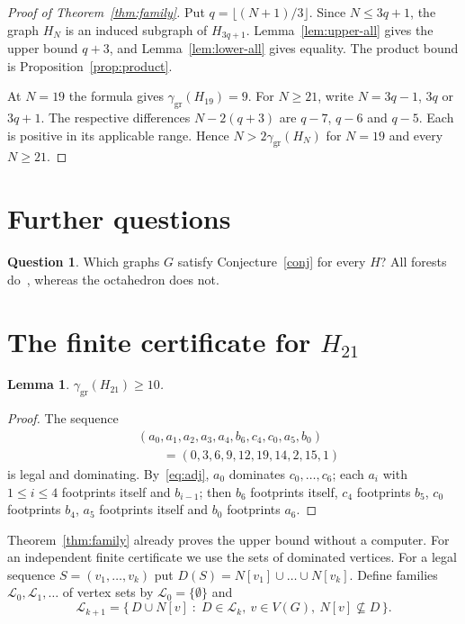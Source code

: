 \documentclass[screen]{aomart}
\newtheorem{lemma}[theorem]{Lemma}
\theoremstyle{definition}
\newtheorem{question}[theorem]{Question}
\theoremstyle{remark}
\numberwithin{equation}{section}
\newcommand{\ggr}{\gamma_{\mathrm{gr}}}
\begin{document}
\begin{proof}[Proof of Theorem~\ref{thm:family}]
Put $q=\lfloor(N+1)/3\rfloor$. Since $N\le3q+1$, the graph $H_N$ is an induced subgraph of $H_{3q+1}$. Lemma~\ref{lem:upper-all} gives the upper bound $q+3$, and Lemma~\ref{lem:lower-all} gives equality. The product bound is Proposition~\ref{prop:product}.

At $N=19$ the formula gives $\ggr(H_{19})=9$. For $N\ge21$, write $N=3q-1$, $3q$ or $3q+1$. The respective differences $N-2(q+3)$ are $q-7$, $q-6$ and $q-5$. Each is positive in its applicable range. Hence $N>2\ggr(H_N)$ for $N=19$ and every $N\ge21$.
\end{proof}


\section{Further questions}
\begin{question}
Which graphs $G$ satisfy Conjecture~\ref{conj} for every $H$? All forests do~\cite{BDKW}, whereas the octahedron does not.
\end{question}

\appendix
\section{The finite certificate for \texorpdfstring{$H_{21}$}{H21}}\label{sec:H21}

\begin{lemma}\label{lem:h21lower}
$\ggr(H_{21})\ge10$.
\end{lemma}

\begin{proof}
The sequence
\[
 \begin{aligned}
 &(a_0,a_1,a_2,a_3,a_4,b_6,c_4,c_0,a_5,b_0)\\
 &\qquad=(0,3,6,9,12,19,14,2,15,1)
 \end{aligned}
\]
is legal and dominating. By~\eqref{eq:adj}, $a_0$ dominates $c_0,\dots,c_6$; each $a_i$ with $1\le i\le4$ footprints itself and $b_{i-1}$; then $b_6$ footprints itself, $c_4$ footprints $b_5$, $c_0$ footprints $b_4$, $a_5$ footprints itself and $b_0$ footprints $a_6$.
\end{proof}

Theorem~\ref{thm:family} already proves the upper bound without a computer. For an independent finite certificate we use the sets of dominated vertices. For a legal sequence $S=(v_1,\dots,v_k)$ put $D(S)=N[v_1]\cup\dots\cup N[v_k]$. Define families $\mathcal L_0,\mathcal L_1,\dots$ of vertex sets by $\mathcal L_0=\{\emptyset\}$ and
\[
  \mathcal L_{k+1}=\big\{\,D\cup N[v]\;:\;D\in\mathcal L_k,\ v\in V(G),\ N[v]\not\subseteq D\,\big\}.
\]
\end{document}
